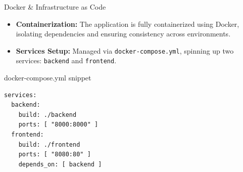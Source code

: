 \begin{frame}[fragile]{Docker \& Infrastructure as Code}
\begin{itemize}
    \item \textbf{Containerization:} The application is fully containerized using Docker, isolating dependencies and ensuring consistency across environments.
    \item \textbf{Services Setup:} Managed via \texttt{docker-compose.yml}, spinning up two services: \texttt{backend} and \texttt{frontend}.
\end{itemize}

\begin{block}{docker-compose.yml snippet}
\begin{verbatim}
services:
  backend:
    build: ./backend
    ports: [ "8000:8000" ]
  frontend:
    build: ./frontend
    ports: [ "8080:80" ]
    depends_on: [ backend ]
\end{verbatim}
\end{block}
\end{frame}
